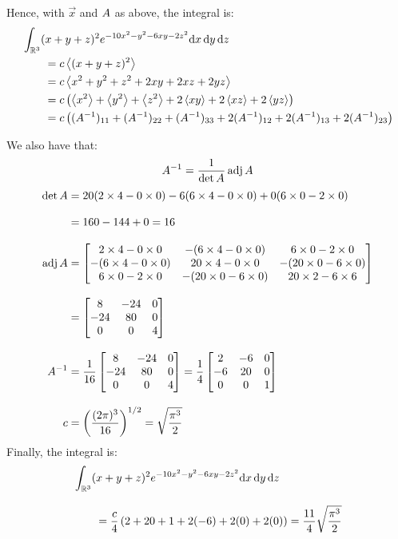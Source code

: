 Hence, with $\vec{x}$ and ${A}$ as above, the integral is:
\begin{align}
   & \int_{\mathbb{R}^3} (x + y + z)^2 e^{-10x^2 - y^2 - 6xy - 2z^2} \text{d}{}{x}\,\text{d}{}{y}\,\text{d}{}{z}
  \nonumber
  \\
   & \qquad =
  c \left\langle{(x + y + z)^2}\right\rangle
  \nonumber
  \\
   & \qquad =
  c \left\langle{x^2 + y^2 + z^2 + 2xy + 2xz + 2yz}\right\rangle
  \nonumber
  \\
   & \qquad =
  c \left(\left\langle{x^2}\right\rangle + \left\langle{y^2}\right\rangle + \left\langle{z^2}\right\rangle + 2\left\langle{xy}\right\rangle + 2\left\langle{xz}\right\rangle + 2\left\langle{yz}\right\rangle\right)
  \nonumber
  \\
   & \qquad =
  c \left((A^{-1})_{11} + (A^{-1})_{22} + (A^{-1})_{33} + 2(A^{-1})_{12} + 2(A^{-1})_{13} + 2(A^{-1})_{23}\right)
\end{align}

We also have that:
\begin{equation}
  {A}^{-1} = \frac{1}{\det{A}}\operatorname{\text{adj}}{A}
\end{equation}
\begin{align*}
  \det{A}
    & =
  20 (2 \times 4 - 0 \times 0) - 6 (6 \times 4 - 0 \times 0) + 0 (6 \times 0 - 2 \times 0)
  \\[2ex]
    & = 160 - 144 + 0 = 16
  \\[2ex]
  \operatorname{\text{adj}}{A}
    & =
  \begin{bmatrix}
    2 \times 4 - 0 \times 0    & -(6 \times 4 - 0 \times 0)  & 6 \times 0 - 2 \times 0
    \\
    -(6 \times 4 - 0 \times 0) & 20 \times 4 - 0 \times 0    & -(20 \times 0 - 6 \times 0)
    \\
    6 \times 0 - 2 \times 0    & -(20 \times 0 - 6 \times 0) & 20 \times 2 - 6 \times 6
  \end{bmatrix}
  \\[2ex]
    & =
  \begin{bmatrix}
    8   & -24 & 0
    \\
    -24 & 80  & 0
    \\
    0   & 0   & 4
  \end{bmatrix}
  \\[2ex]
  {A}^{-1}
    & = \frac{1}{16}
  \begin{bmatrix}
    8   & -24 & 0
    \\
    -24 & 80  & 0
    \\
    0   & 0   & 4
  \end{bmatrix}
  = \frac{1}{4}
  \begin{bmatrix}
    2  & -6 & 0
    \\
    -6 & 20 & 0
    \\
    0  & 0  & 1
  \end{bmatrix}
  \\[2ex]
  c & =
  \left(\frac{(2\pi)^3}{16}\right)^{1/2} = \sqrt{\frac{\pi^3}{2}}
\end{align*}
Finally, the integral is:
\begin{align*}
   & \int_{\mathbb{R}^3} (x + y + z)^2 e^{-10x^2 - y^2 - 6xy - 2z^2} \text{d}{}{x}\,\text{d}{}{y}\,\text{d}{}{z}
  \\[2ex]
   & \qquad = \frac{c}{4}\left(2 + 20 + 1 + 2(-6) + 2(0) + 2(0)\right)
  = \frac{11}{4} \sqrt{\frac{\pi^3}{2}}
\end{align*}
